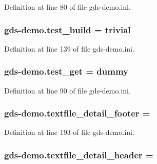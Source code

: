 Definition at line 80 of file gds-\/demo.\-ini.

\hypertarget{namespacegds-demo_abd6703039114d65bab135fc23457905a}{
\subsubsection[{test\-\_\-build}]{\setlength{\rightskip}{0pt plus 5cm}gds-\/demo.\-test\-\_\-build = trivial}}\label{namespacegds-demo_abd6703039114d65bab135fc23457905a}


Definition at line 139 of file gds-\/demo.\-ini.

\hypertarget{namespacegds-demo_a78e16fa54810a3de508ccdce748d9d01}{
\subsubsection[{test\-\_\-get}]{\setlength{\rightskip}{0pt plus 5cm}gds-\/demo.\-test\-\_\-get = dummy}}\label{namespacegds-demo_a78e16fa54810a3de508ccdce748d9d01}


Definition at line 90 of file gds-\/demo.\-ini.

\hypertarget{namespacegds-demo_a7b2740aecad3e48a8252e41b8e4e0aac}{
\subsubsection[{textfile\-\_\-detail\-\_\-footer}]{\setlength{\rightskip}{0pt plus 5cm}gds-\/demo.\-textfile\-\_\-detail\-\_\-footer =}}\label{namespacegds-demo_a7b2740aecad3e48a8252e41b8e4e0aac}


Definition at line 193 of file gds-\/demo.\-ini.

\hypertarget{namespacegds-demo_a58b62d7de4b3e126d25d88e6cdb438cf}{
\subsubsection[{textfile\-\_\-detail\-\_\-header}]{\setlength{\rightskip}{0pt plus 5cm}gds-\/demo.\-textfile\-\_\-detail\-\_\-header =}}\label{namespacegds-demo_a58b62d7de4b3e126d25d88e6cdb438cf}


